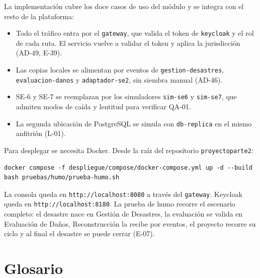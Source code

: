 \documentclass[11pt,a4paper]{article}
\begin{document}
La implementación cubre los doce casos de uso del módulo y se integra con el resto de la plataforma:

\begin{itemize}
  \item Todo el tráfico entra por el \texttt{gateway}, que valida el token de \texttt{keycloak} y el rol de cada
        ruta. El servicio vuelve a validar el token y aplica la jurisdicción (AD-49, E-39).
  \item Las copias locales se alimentan por eventos de \texttt{gestion-desastres}, \texttt{evaluacion-danos} y
        \texttt{adaptador-se2}, sin siembra manual (AD-46).
  \item SE-6 y SE-7 se reemplazan por los simuladores \texttt{sim-se6} y \texttt{sim-se7}, que admiten modos de
        caída y lentitud para verificar QA-01.
  \item La segunda ubicación de PostgreSQL se simula con \texttt{db-replica} en el mismo anfitrión (L-01).
\end{itemize}

Para desplegar se necesita Docker. Desde la raíz del repositorio \texttt{proyectoparte2}:

\begin{verbatim}
docker compose -f despliegue/compose/docker-compose.yml up -d --build
bash pruebas/humo/prueba-humo.sh
\end{verbatim}

La consola queda en \texttt{http://localhost:8080} a través del \texttt{gateway}. Keycloak queda en
\texttt{http://localhost:8180}. La prueba de humo recorre el escenario completo: el desastre nace en Gestión de
Desastres, la evaluación se valida en Evaluación de Daños, Reconstrucción la recibe por eventos, el proyecto recorre
su ciclo y al final el desastre se puede cerrar (E-07).

\section*{Glosario}
\end{document}
